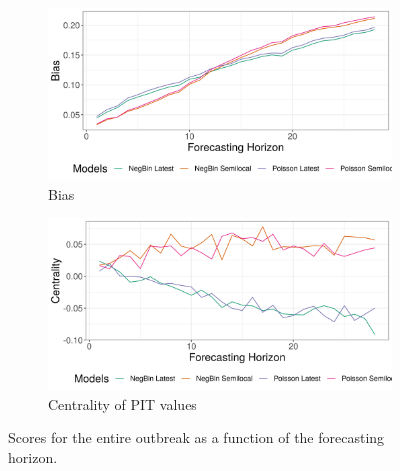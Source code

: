 \begin{figure}[H]
\begin{subfigure}{0.5\textwidth}
  \centering
  \includegraphics[width=\linewidth]{../output/Mangurujipa_bias.png}  
  \caption{Bias}
  \label{fig:sub-third}
\end{subfigure}
\begin{subfigure}{0.5\textwidth}
  \centering
  \includegraphics[width=\linewidth]{../output/Mangurujipa_centrality.png}  
  \caption{Centrality of PIT values}
  \label{fig:nat_scores_4}
\end{subfigure}
  \caption{Scores for the entire outbreak as a function of the forecasting horizon.}

  \label{fig:nat_scores}
\end{figure}
